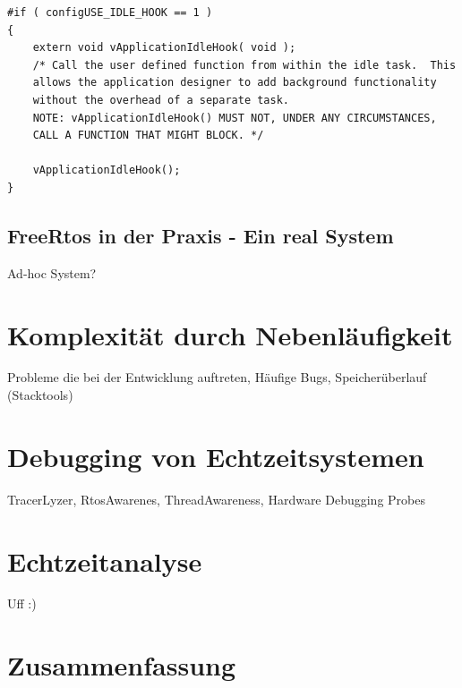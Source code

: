 \documentclass[ngerman]{seminarvorlage}
\begin{document}
	
\begin{lstlisting}[caption={Aufruf der IdleTask Hook Funktion. Aus Task.c},captionpos=b, label=lst:xIdleTaskHook, float=hbt!]
#if ( configUSE_IDLE_HOOK == 1 )
{
	extern void vApplicationIdleHook( void );
	/* Call the user defined function from within the idle task.  This
	allows the application designer to add background functionality
	without the overhead of a separate task.
	NOTE: vApplicationIdleHook() MUST NOT, UNDER ANY CIRCUMSTANCES,
	CALL A FUNCTION THAT MIGHT BLOCK. */
	
	vApplicationIdleHook();
}     
\end{lstlisting}    


\subsection{FreeRtos in der Praxis - Ein real System}
Ad-hoc System? 
\section{Komplexität durch Nebenläufigkeit}
Probleme die bei der Entwicklung auftreten, Häufige Bugs, Speicherüberlauf (Stacktools)
\section{Debugging von Echtzeitsystemen}
TracerLyzer, RtosAwarenes, ThreadAwareness, Hardware Debugging Probes 
\label{sec:Debugging von Echtzeitsystemen}
\section{Echtzeitanalyse}
Uff :)
\label{sec:Echtzeitanalyse} 

 
\section{Zusammenfassung}
\pagebreak

\end{document}
